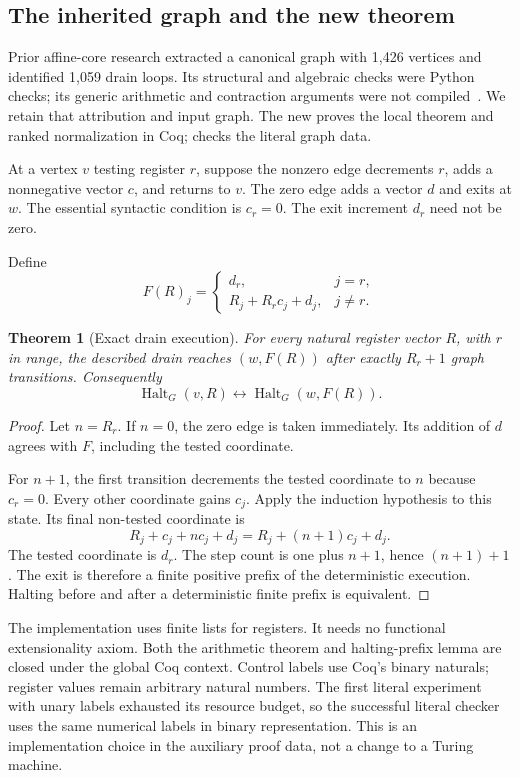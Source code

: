 \documentclass[11pt]{article}
\newtheorem{theorem}{Theorem}[section]
\newcommand{\Halt}{\operatorname{Halt}}
\newcommand{\code}[1]{\texttt{\detokenize{#1}}}
\begin{document}
\subsection{The inherited graph and the new theorem}

Prior affine-core research extracted a canonical graph with 1,426 vertices and identified 1,059 drain loops. Its structural and algebraic checks were Python checks; its generic arithmetic and contraction arguments were not compiled~\cite{affineprior}. We retain that attribution and input graph. The new \code{DrainAffine.v} proves the local theorem and ranked normalization in Coq; \code{DrainInstances.v} checks the literal graph data.

At a vertex $v$ testing register $r$, suppose the nonzero edge decrements $r$, adds a nonnegative vector $c$, and returns to $v$. The zero edge adds a vector $d$ and exits at $w$. The essential syntactic condition is $c_r=0$. The exit increment $d_r$ need not be zero.

Define
\[
 F(R)_j=
 \begin{cases}
 d_r,&j=r,\\
 R_j+R_r c_j+d_j,&j\ne r.
 \end{cases}
\]

\begin{theorem}[Exact drain execution]
For every natural register vector $R$, with $r$ in range, the described drain reaches $(w,F(R))$ after exactly $R_r+1$ graph transitions. Consequently
\[
 \Halt_G(v,R)\leftrightarrow\Halt_G(w,F(R)).
\]
\end{theorem}

\begin{proof}
Let $n=R_r$. If $n=0$, the zero edge is taken immediately. Its addition of $d$ agrees with $F$, including the tested coordinate.

For $n+1$, the first transition decrements the tested coordinate to $n$ because $c_r=0$. Every other coordinate gains $c_j$. Apply the induction hypothesis to this state. Its final non-tested coordinate is
\[
 R_j+c_j+n c_j+d_j=R_j+(n+1)c_j+d_j.
\]
The tested coordinate is $d_r$. The step count is one plus $n+1$, hence $(n+1)+1$. The exit is therefore a finite positive prefix of the deterministic execution. Halting before and after a deterministic finite prefix is equivalent.
\end{proof}

The implementation uses finite lists for registers. It needs no functional extensionality axiom. Both the arithmetic theorem and halting-prefix lemma are closed under the global Coq context. Control labels use Coq's binary naturals; register values remain arbitrary natural numbers. The first literal experiment with unary labels exhausted its resource budget, so the successful literal checker uses the same numerical labels in binary representation. This is an implementation choice in the auxiliary proof data, not a change to a Turing machine.
\end{document}

